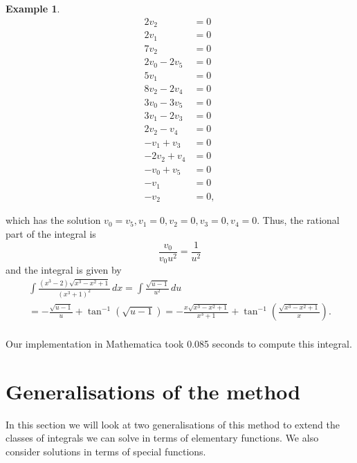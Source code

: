 \documentclass[12pt]{article}
\numberwithin{equation}{section}
\def\todo#1{\textcolor{red}{\textbf{**** TODO -- #1 ****}}}
\theoremstyle{definition}
\newtheorem{example}{Example}[section]
\begin{document}
\begin{example}
\begin{align*}
 2 v_2&=0 \\
 2 v_1&=0 \\
 7 v_2&=0 \\
 2 v_0-2 v_5&=0 \\
 5 v_1&=0 \\
 8 v_2-2 v_4&=0 \\
 3 v_0-3 v_5&=0 \\
 3 v_1-2 v_3&=0 \\
 2 v_2-v_4&=0 \\
 -v_1+v_3&=0 \\
 -2 v_2+v_4&=0 \\
 -v_0+v_5&=0 \\
 -v_1&=0 \\
 -v_2&=0,
\end{align*}

which has the solution $v_0=v_5,v_1=0,v_2=0,v_3=0,v_4=0$. Thus, the rational part of the integral is
$$\frac{v_0}{v_0u^2}=\frac{1}{u^2}$$
and the integral is given by 
\begin{multline*}
\int \frac{\left(x^3-2\right) \sqrt{x^3-x^2+1}}{\left(x^3+1\right)^2} \, dx 
=\int \frac{\sqrt{u-1}}{u^2} \, du \\
=-\frac{\sqrt{u-1}}{u}+\tan ^{-1}\left(\sqrt{u-1}\right)
=-\frac{x\sqrt{x^3-x^2+1}}{x^3+1}+\tan ^{-1}\left(\frac{\sqrt{x^3-x^2+1}}{x}\right).\\
\end{multline*}
\end{example}

Our implementation in Mathematica took 0.085 seconds to compute this integral.  

\iffalse
\begin{example}
In our final example we consider the particularly elegant integral 
$$\int\frac{\left(x^2-1\right)\sqrt{x^4+x^2+1}}{\left(x^2+1\right)\left(x^4+x^3+x^2+x+1\right)} \, dx.$$

\todo{Finish this example.}

\end{example}
\fi

\iffalse
\section{Generalisations of the method}

In this section we will look at two generalisations of this method to extend the 
classes of integrals we can solve in terms of elementary functions. We also 
consider solutions in terms of special functions. 
\end{document}
